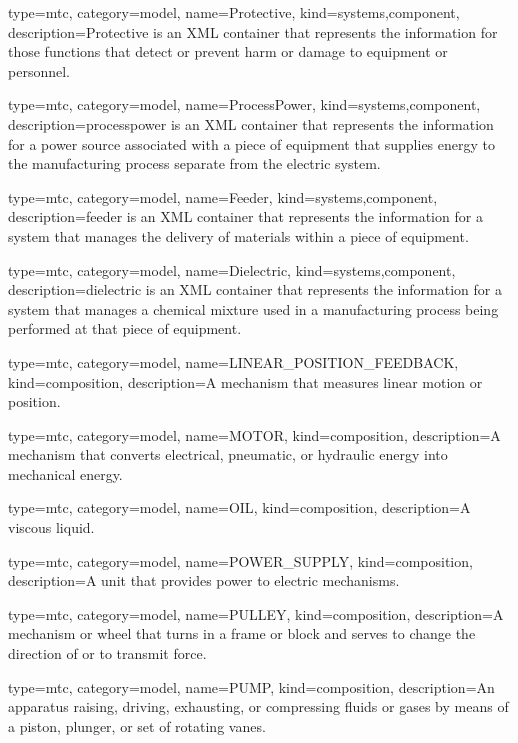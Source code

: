 {
  type=mtc,
  category=model,
  name={Protective},
  kind={systems,component},
  description={Protective is an XML container that represents the information for those functions that detect or prevent harm or damage to equipment or personnel.}
}


{
  type=mtc,
  category=model,
  name={ProcessPower},
  kind={systems,component},
  description={\gls{processpower} is an XML container that represents the information for a power source associated with a piece of equipment that supplies energy to the manufacturing process separate from the \gls{electric} system.}
}


{
  type=mtc,
  category=model,
  name={Feeder},
  kind={systems,component},
  description={\gls{feeder} is an XML container that represents the information for a system that manages the delivery of materials within a piece of equipment. }
}


{
  type=mtc,
  category=model,
  name={Dielectric},
  kind={systems,component},
  description={\gls{dielectric} is an XML container that represents the information for a system that manages a chemical mixture used in a manufacturing process being performed at that piece of equipment.}
}


{
  type=mtc,
  category=model,
  name={LINEAR\_POSITION\_FEEDBACK},
  kind={composition},
  description={A mechanism that measures linear motion or position.}
}


{
  type=mtc,
  category=model,
  name={MOTOR},
  kind={composition},
  description={A mechanism that converts electrical, pneumatic, or hydraulic energy into mechanical energy.}
}


{
  type=mtc,
  category=model,
  name={OIL},
  kind={composition},
  description={A viscous liquid.}
}


{
  type=mtc,
  category=model,
  name={POWER\_SUPPLY},
  kind={composition},
  description={A unit that provides power to electric mechanisms.}
}


{
  type=mtc,
  category=model,
  name={PULLEY},
  kind={composition},
  description={A mechanism or wheel that turns in a frame or block and serves to change the direction of or to transmit force.}
}


{
  type=mtc,
  category=model,
  name={PUMP},
  kind={composition},
  description={An apparatus raising, driving, exhausting, or compressing fluids or gases by means of a piston, plunger, or set of rotating vanes.}
}


